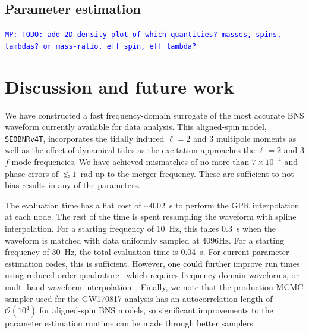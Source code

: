 \documentclass[prd,aps,letter,twocolumn,floatfix,notitlepage,nofootinbib]{revtex4-1}
\newcommand{\MP}[1]{{\textcolor{blue}{\texttt{MP: #1}} }}
\begin{document}
\subsection{Parameter estimation}

\MP{TODO: add 2D density plot of which quantities? masses, spins, lambdas?
or mass-ratio, eff spin, eff lambda?}


\section{Discussion and future work}

We have constructed a fast frequency-domain surrogate of the most accurate BNS waveform currently available for data analysis. This aligned-spin model, \texttt{SEOBNRv4T}, incorporates the tidally induced $\ell=2$ and 3 multipole moments as well as the effect of dynamical tides as the excitation approaches the $\ell=2$ and 3 $f$-mode frequencies. We have achieved mismatches of no more than $7 \times 10^{-4}$ and phase errors of $\lesssim 1$~rad up to the merger frequency. These are sufficient to not bias results in any of the parameters.

The evaluation time has a flat cost of $\sim 0.02$~s to perform the GPR interpolation at each node. The rest of the time is spent resampling the waveform with spline interpolation. For a starting frequency of 10~Hz, this takes 0.3~s when the waveform is matched with data uniformly sampled at 4096Hz. For a starting frequency of 30~Hz, the total evaluation time is 0.04~s. For current parameter estimation codes, this is sufficient. However, one could further improve run times using reduced order quadrature~\cite{Antil2013, CanizaresFieldGair2013, CanizaresFieldGair2015} which requires frequency-domain waveforms, or multi-band waveform interpolation~\cite{VinciguerraVeitchMandel2017}. Finally, we note that the production MCMC sampler used for the GW170817 analysis has an autocorrelation length of $\mathcal{O}(10^4)$ for aligned-spin BNS models, so significant improvements to the parameter estimation runtime can be made through better samplers. 
\end{document}
